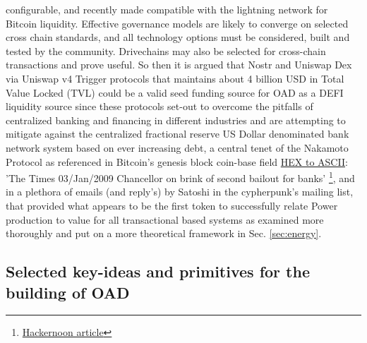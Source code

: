 \documentclass[final,5p,times,twocolumn,authoryear]{elsarticle}
\begin{document}
configurable, and recently made compatible with the lightning network for Bitcoin liquidity. Effective governance models are likely to converge on selected cross chain standards, and all technology options must be considered, built and tested by the community. Drivechains may also be selected for cross-chain transactions and prove useful.  So then it is argued that Nostr and Uniswap Dex via Uniswap v4 Trigger protocols that maintains about 4 billion USD in Total Value Locked (TVL) could be a valid seed funding source for OAD as a DEFI liquidity source since these protocols set-out to overcome the pitfalls of centralized banking and financing in different industries and are attempting to mitigate against the centralized fractional reserve US Dollar denominated bank network system based on ever increasing debt, a central tenet of the Nakamoto Protocol as referenced in Bitcoin's genesis block \textrm{coin-base field} \href{https://www.Blockchain.com/btc/tx/4a5e1e4baab89f3a32518a88c31bc87f618f76673e2cc77ab2127b7afdeda33b}{HEX to ASCII}:  'The Times 03/Jan/2009 Chancellor on brink of second bailout for banks' \footnote{\href{https://hackernoon.com/chancellor-on-brink-of-second-bailout-for-banks-where-to-find-this-on-the-bitcoin-blockchain-hm4k34v4}{Hackernoon article}}, and in a plethora of emails (and reply's) by Satoshi in the cypherpunk's mailing list, that provided what appears to be the first token to successfully relate Power production to value for all transactional based systems as examined more thoroughly and put on a more theoretical framework in Sec. \ref{sec:energy}.

\subsection{Selected key-ideas and primitives for the building of OAD}
\label{subsec: review}
\end{document}
